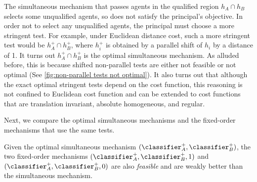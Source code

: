 The simultaneous mechanism that passes agents in the qualified region $%
h_{A}\cap h_{B}$ selects some unqualified agents, so does not satisfy
the principal's objective. In order not to select any unqualified agents,
the principal must choose a more stringent test. For example, under Euclidean distance cost, such a more
stringent test would be $h_{A}^{+}\cap h_{B}^{+}$, where $h_{i}^{+}$ is
obtained by a parallel shift of $h_{i}$ by a distance of 1. It turns out $h_{A}^{+}\cap
h_{B}^{+}$ is the optimal simultaneous mechanism.
As alluded before, this is because shifted non-parallel tests are either not feasible or not optimal (See \cref{fig:non-parallel tests not optimal}).
 It also turns out that although the exact optimal stringent tests depend on the cost function, this reasoning is not confined to Euclidean cost function and can be extended to cost functions that are translation invariant, absolute homogeneous, and regular.

Next, we compare the optimal simultaneous mechanisms and the fixed-order mechanisms that use the same tests. 
\begin{lemma}\label{lem:fix-simul}
    Given the optimal simultaneous mechanism  $(\classifier_A^{+},\classifier_B^{+})$, the two  fixed-order mechanisms $(\classifier_A^{+},\classifier_B^{+},1)$ and $(\classifier_A^{+},\classifier_B^{+},0)$ are also \emph{feasible} and  are weakly better than the simultaneous mechanism. 
\end{lemma}



